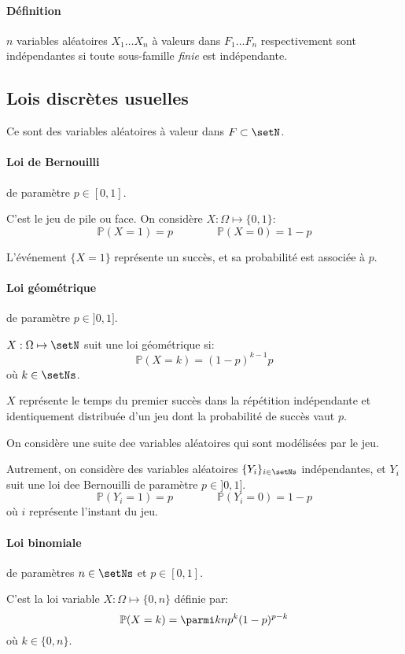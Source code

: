 \documentclass[a4paper,10pt,french,openany]{memoir}
\newcommand{\Proba}{\mathbb{P}}
\begin{document}
\paragraph{Définition}
$n$ variables aléatoires $X_1\dots X_n$ à valeurs dans $F_1\dots F_n$ respectivement sont indépendantes si toute sous-famille \emph{finie} est indépendante.

\subsection{Lois discrètes usuelles}

Ce sont des variables aléatoires à valeur dans $F \subset \setN$.

\paragraph{Loi de Bernouilli} de paramètre $p \in [0,1]$.

C'est le jeu de pile ou face. On considère $X: \Omega \mapsto \{0,1\}$:
\[ \Proba(X=1)=p \qquad\qquad \Proba(X=0)=1-p \]

L'événement $\{X=1\}$ représente un succès, et sa probabilité est associée à $p$.

\paragraph{Loi géométrique} de paramètre $p \in ]0,1]$.

$X:\Omega \mapsto \setN$ suit une loi géométrique si:
\[ \Proba(X=k)=(1-p)^{k-1}p \]
où $k \in \setNs$.

$X$ représente le temps du premier succès dans la répétition indépendante et identiquement distribuée d'un jeu dont la probabilité de succès vaut $p$.

On considère une suite dee variables aléatoires qui sont modélisées par le jeu.

Autrement, on considère des variables aléatoires $\{Y_i\}_{i\in \setNs}$ indépendantes, et $Y_i$ suit une loi dee Bernouilli de paramètre $p\in ]0,1]$.
\[ \Proba(Y_i = 1) = p \qquad\qquad \Proba(Y_i=0)=1-p \]
où $i$ représente l'instant du jeu.

\paragraph{Loi binomiale} de paramètres $n\in \setNs$ et $p\in [0,1]$.

C'est la loi variable $X:\Omega \mapsto \{0,n\}$ définie par: 
\[\Proba(X=k)=\parmi k n p^k (1-p)^{p-k}\]
où $k \in \{0,n\}$.
\end{document}

